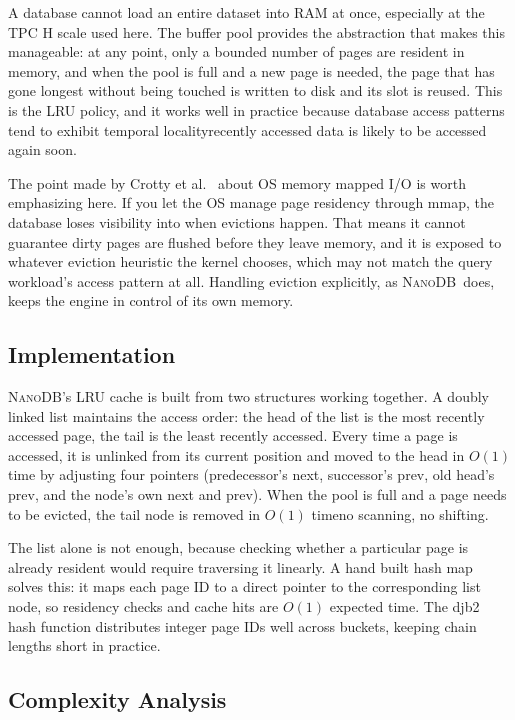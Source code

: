 \documentclass[conference]{IEEEtran}
\newcommand{\NanoDB}{\textsc{NanoDB}}
\begin{document}
A database cannot load an entire dataset into RAM at once, especially at the
TPC H scale used here. The buffer pool provides the abstraction that makes this
manageable: at any point, only a bounded number of pages are resident in memory,
and when the pool is full and a new page is needed, the page that has gone longest
without being touched is written to disk and its slot is reused. This is the LRU
policy, and it works well in practice because database access patterns tend to
exhibit temporal localityrecently accessed data is likely to be accessed again
soon.

The point made by Crotty et al.~\cite{crotty2022} about OS memory mapped I/O is
worth emphasizing here. If you let the OS manage page residency through mmap, the
database loses visibility into when evictions happen. That means it cannot
guarantee dirty pages are flushed before they leave memory, and it is exposed to
whatever eviction heuristic the kernel chooses, which may not match the query
workload's access pattern at all. Handling eviction explicitly, as \NanoDB\ does,
keeps the engine in control of its own memory.

\subsection{Implementation}

\NanoDB's LRU cache is built from two structures working together. A
doubly linked list maintains the access order: the head of the list is the most
recently accessed page, the tail is the least recently accessed. Every time a
page is accessed, it is unlinked from its current position and moved to the head
in $O(1)$ time by adjusting four pointers (predecessor's next, successor's prev,
old head's prev, and the node's own next and prev). When the pool is full and a
page needs to be evicted, the tail node is removed in $O(1)$ timeno scanning,
no shifting.

The list alone is not enough, because checking whether a particular page is
already resident would require traversing it linearly. A hand built hash map
solves this: it maps each page ID to a direct pointer to the corresponding list
node, so residency checks and cache hits are $O(1)$ expected time. The djb2
hash function distributes integer page IDs well across buckets, keeping chain
lengths short in practice.

\subsection{Complexity Analysis}
\end{document}
